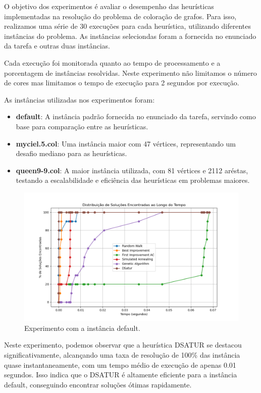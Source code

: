 \documentclass[12pt,a4paper]{article}
\begin{document}
O objetivo dos experimentos é avaliar o desempenho das heurísticas implementadas na resolução do problema de coloração de grafos. Para isso, realizamos uma série de 30 execuções para cada heurística, utilizando diferentes instâncias do problema. As instâncias seleciondas foram a fornecida no enunciado da tarefa e outras duas instâncias.

Cada execução foi monitorada quanto ao tempo de processamento e a porcentagem de instâncias resolvidas. Neste experimento não limitamos o número de cores mas limitamos o tempo de execução para 2 segundos por execução.

As instâncias utilizadas nos experimentos foram:

\begin{itemize}
 \item \textbf{default}: A instância padrão fornecida no enunciado da tarefa, servindo como base para comparação entre as heurísticas.
 \item \textbf{myciel.5.col}: Uma instância maior com 47 vértices, representando um desafio mediano para as heurísticas.
 \item \textbf{queen9-9.col}: A maior instância utilizada, com 81 vértices e 2112 aréstas, testando a escalabilidade e eficiência das heurísticas em problemas maiores.
\end{itemize}

\begin{figure}[H]
    \centering
    \includegraphics[width=1\textwidth]{./img/output-default.png}
    \caption{Experimento com a instância default.}
    \label{fig:experimento-default}
\end{figure}

Neste experimento, podemos observar que a heurística DSATUR se destacou significativamente, alcançando uma taxa de resolução de 100\% das instância quase instantaneamente, com um tempo médio de execução de apenas 0.01 segundos. Isso indica que o DSATUR é altamente eficiente para a instância default, conseguindo encontrar soluções ótimas rapidamente.
\end{document}
